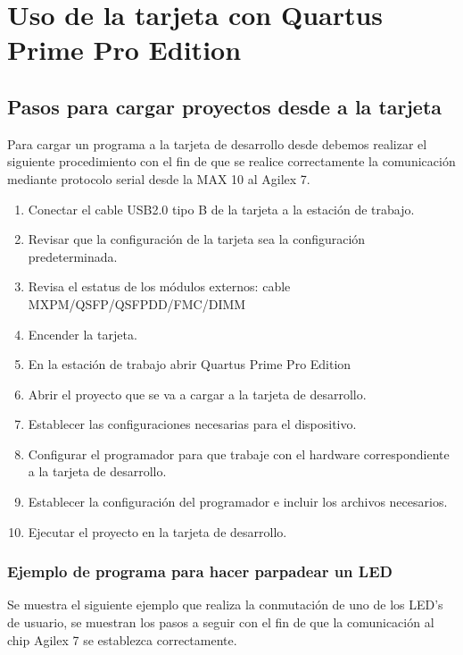 \chapter{Uso de la tarjeta con Quartus Prime Pro Edition}

\section{Pasos para cargar proyectos desde \quartus a la tarjeta}

    Para cargar un programa a la tarjeta de desarrollo desde \quartus debemos realizar el siguiente procedimiento con el fin de que se realice correctamente la comunicación mediante protocolo serial desde la MAX 10 al Agilex 7.

    \begin{enumerate}
        \item Conectar el cable USB2.0 tipo B de la tarjeta a la estaci\'on de trabajo.
        \item Revisar que la configuraci\'on de la tarjeta sea la configuraci\'on predeterminada.
        \item Revisa el estatus de los m\'odulos externos: cable MXPM/QSFP/QSFPDD/FMC/DIMM
        \item Encender la tarjeta.
        \item En la estaci\'on de trabajo abrir Quartus Prime Pro Edition
        \item Abrir el proyecto que se va a cargar a la tarjeta de desarrollo.
        \item Establecer las configuraciones necesarias para el dispositivo.
        \item Configurar el programador para que trabaje con el hardware correspondiente a la tarjeta de desarrollo.
        \item Establecer la configuraci\'on del programador e incluir los archivos necesarios.
        \item Ejecutar el proyecto en la tarjeta de desarrollo.
    \end{enumerate}

\subsection{Ejemplo de programa para hacer parpadear un LED}

    Se muestra el siguiente ejemplo que realiza la conmutaci\'on de uno de los LED's de usuario, se muestran los pasos a seguir con el fin de que la comunicaci\'on al chip Agilex 7 se establezca correctamente. 
    
